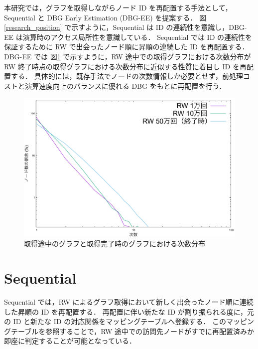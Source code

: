 本研究では，グラフを取得しながらノード ID を再配置する手法として，Sequential と DBG Early Estimation (DBG-EE) を提案する．
図\ref{research_position} で示すように，Sequential は ID の連続性を意識し，DBG-EE は演算時のアクセス局所性を意識している．
Sequential では ID の連続性を保証するために RW で出会ったノード順に昇順の連続した ID を再配置する．
DBG-EE では 図\ref{degree_appro} で示すように，RW 途中での取得グラフにおける次数分布が RW 終了時点の取得グラフにおける次数分布に近似する性質に着目し ID を再配置する．
具体的には，既存手法でノードの次数情報しか必要とせず，前処理コストと演算速度向上のバランスに優れる DBG \cite{faldu2019closer} をもとに再配置を行う．
\begin{figure}[t]
  \centering
  \includegraphics[width=12cm]{./figure/degree_dist.pdf}
  \caption{取得途中のグラフと取得完了時のグラフにおける次数分布}
  \label{degree_appro}
\end{figure}
\section{Sequential}
Sequential では，RW によるグラフ取得において新しく出会ったノード順に連続した昇順の ID を再配置する．
再配置に伴い新たな ID が割り振られる度に，元の ID と新たな ID の対応関係をマッピングテーブルへ登録する．
このマッピングテーブルを参照することで，RW 途中での訪問先ノードがすでに再配置済みか即座に判定することが可能となっている．

